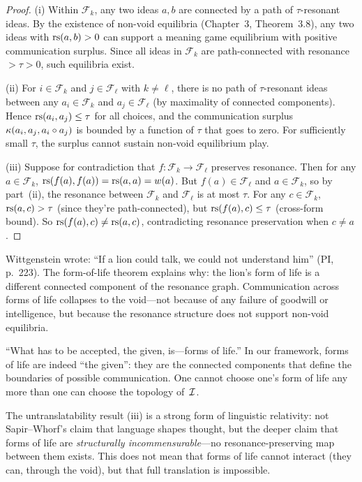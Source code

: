 \begin{proof}
(i) Within $\mathcal{F}_k$, any two ideas $a, b$ are connected
by a path of $\tau$-resonant ideas.  By the existence of
non-void equilibria (Chapter~3, Theorem~3.8), any two ideas
with $\mathrm{rs}(a,b) > 0$ can support a meaning game equilibrium with
positive communication surplus.  Since all ideas in $\mathcal{F}_k$
are path-connected with resonance $> \tau > 0$, such equilibria exist.

(ii) For $i \in \mathcal{F}_k$ and $j \in \mathcal{F}_\ell$
with $k \ne \ell$, there is no path of $\tau$-resonant ideas
between any $a_i \in \mathcal{F}_k$ and $a_j \in \mathcal{F}_\ell$
(by maximality of connected components).  Hence
$\mathrm{rs}(a_i, a_j) \le \tau$ for all choices, and the communication
surplus $\kappa(a_i, a_j, a_i \circ a_j)$ is bounded by
a function of $\tau$ that goes to zero.  For sufficiently small
$\tau$, the surplus cannot sustain non-void equilibrium play.

(iii) Suppose for contradiction that $f \colon \mathcal{F}_k
\to \mathcal{F}_\ell$ preserves resonance.  Then for any
$a \in \mathcal{F}_k$, $\mathrm{rs}(f(a), f(a)) = \mathrm{rs}(a,a) = w(a)$.
But $f(a) \in \mathcal{F}_\ell$ and $a \in \mathcal{F}_k$, so
by part~(ii), the resonance between $\mathcal{F}_k$ and
$\mathcal{F}_\ell$ is at most $\tau$.  For any
$c \in \mathcal{F}_k$, $\mathrm{rs}(a, c) > \tau$ (since they're
path-connected), but $\mathrm{rs}(f(a), c) \le \tau$ (cross-form bound).
So $\mathrm{rs}(f(a), c) \ne \mathrm{rs}(a, c)$, contradicting resonance
preservation when $c \ne a$.
\end{proof}

\begin{interpretation}
Wittgenstein wrote: ``If a lion could talk, we could not understand
him'' (PI, p.~223).  The form-of-life theorem explains why:
the lion's form of life is a different connected component of
the resonance graph.  Communication across forms of life
collapses to the void---not because of any failure of goodwill
or intelligence, but because the resonance structure does not
support non-void equilibria.

``What has to be accepted, the given, is---forms of life.''
In our framework, forms of life are indeed ``the given'':
they are the connected components that define the boundaries
of possible communication.  One cannot choose one's form of
life any more than one can choose the topology of~$\mathcal{I}$.

The untranslatability result (iii) is a strong form of linguistic
relativity: not Sapir--Whorf's claim that language shapes
thought, but the deeper claim that forms of life are
\emph{structurally incommensurable}---no resonance-preserving
map between them exists.  This does not mean that forms of
life cannot interact (they can, through the void), but that
full translation is impossible.
\end{interpretation}

